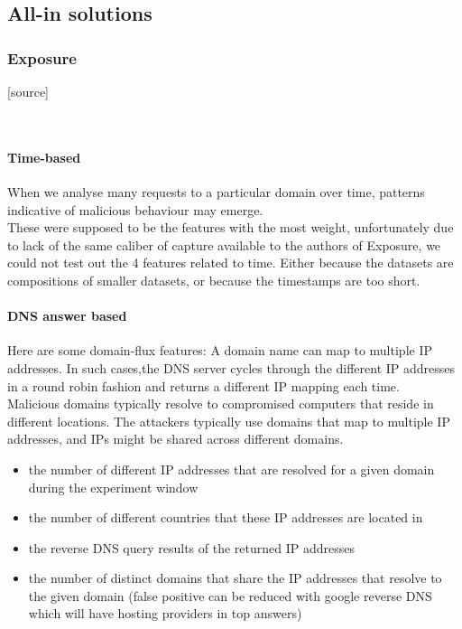 \subsection{All-in solutions}
\subsubsection{Exposure}
[source]

\\

\paragraph{Time-based}
When we analyse many requests to a particular domain over
time, patterns indicative of malicious behaviour may emerge.\\
These were supposed to be the features with the most weight, unfortunately due to lack of the same caliber of capture available to the authors of Exposure, we could not test out the 4 features related to time. Either because the datasets are compositions of smaller datasets, or because the timestamps are too short.
\paragraph{DNS answer based}
Here are some domain-flux features: A domain name can map to multiple IP addresses. In such cases,the DNS server cycles through the different IP addresses in a round robin fashion and returns a different IP mapping each time. \\
Malicious domains typically resolve to compromised computers that reside in different locations. The attackers typically use domains that map to multiple IP addresses, and IPs might be shared across different domains.
\begin{itemize}
\item the number of different IP addresses that are resolved for a given domain during the experiment window
\item the number of different countries that these IP addresses are located in
\item the reverse DNS query results of the returned IP addresses
\item the number of distinct domains that share the IP addresses that resolve to the given domain (false positive can be reduced with google reverse DNS which will have hosting providers in top answers)
\end{itemize}
